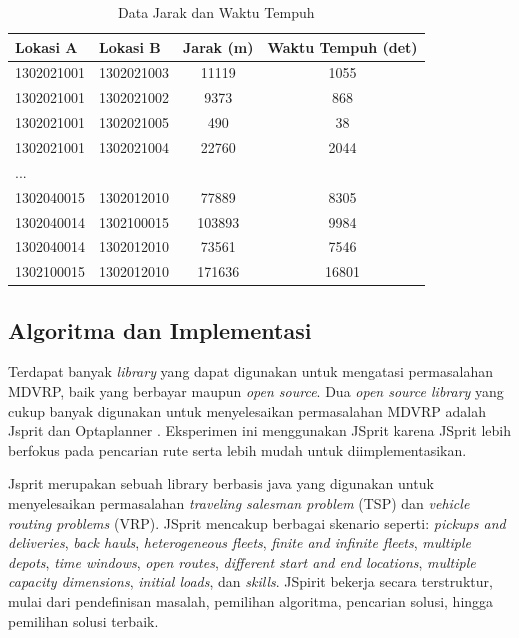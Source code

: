 \begin{table}[!]
	\centering
	\caption{Data Jarak dan Waktu Tempuh}
	\label{tbl:distance_duration_matrix}
	\begin{tabular}{llcc}
		\toprule
		Lokasi A & Lokasi B & Jarak (m) & Waktu Tempuh (det)\\
		\midrule
		1302021001 & 1302021003 & 11119 & 1055\\
		1302021001 & 1302021002 & 9373 & 868\\
		1302021001 & 1302021005 & 490 & 38\\
		1302021001 & 1302021004 & 22760 & 2044\\
		...\\
		1302040015 & 1302012010 & 77889 & 8305\\
		1302040014 & 1302100015 & 103893 & 9984\\
		1302040014 & 1302012010 & 73561 & 7546\\
		1302100015 & 1302012010 & 171636 & 16801\\
		\bottomrule
	\end{tabular}
\end{table}


\subsection{Algoritma dan Implementasi}
\label{ssec:alg-impl}
Terdapat banyak \textit{library} yang dapat digunakan untuk mengatasi permasalahan MDVRP, baik yang berbayar maupun \textit{open source}. Dua \textit{open source library} yang cukup banyak digunakan untuk menyelesaikan permasalahan MDVRP adalah Jsprit \citep{jsprit_jsprit_2014} dan Optaplanner \citep{optaplanner_constraint_2016}. Eksperimen ini menggunakan JSprit karena JSprit lebih berfokus pada pencarian rute serta lebih mudah untuk diimplementasikan. 


Jsprit merupakan sebuah library berbasis java yang digunakan untuk menyelesaikan permasalahan \textit{traveling salesman problem} (TSP) dan \textit{vehicle routing problems} (VRP). JSprit mencakup berbagai skenario seperti: \textit{pickups and deliveries}, \textit{back hauls}, \textit{heterogeneous fleets}, \textit{finite and infinite fleets}, \textit{multiple depots}, \textit{time windows}, \textit{open routes}, \textit{different start and end locations}, \textit{multiple capacity dimensions}, \textit{initial loads}, dan \textit{skills}. JSpirit bekerja secara terstruktur, mulai dari pendefinisan masalah, pemilihan algoritma, pencarian solusi, hingga pemilihan solusi terbaik.


